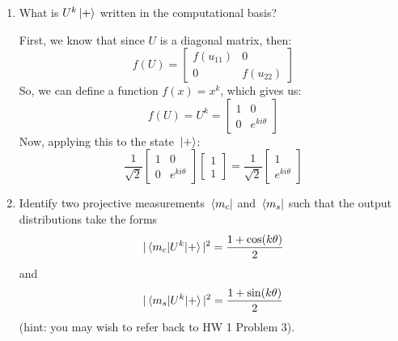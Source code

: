 \documentclass[10pt]{article}
\begin{document}
	 \begin{enumerate}[label=\alph*)]
	 	\item What is \( U^{k}\ket*{+} \) written in the computational basis? 

			\begin{solution}
				First, we know that since \( U \) is a diagonal matrix, then:
				\[
					f(U) = \begin{bmatrix} f(u_{11}) & 0 \\ 0 & f(u_{22}) \end{bmatrix} 
				\] 
				So, we can define a function \( f(x) = x^{k} \), which gives us:
				\[
					f(U) = U^{k} = \begin{bmatrix} 1 & 0 \\ 0 & e^{k i \theta} \end{bmatrix} 
				\] 
				Now, applying this to the state \( \ket*{+} \):
				\[
					\frac{1}{\sqrt{2} }\begin{bmatrix} 1 &0\\0&e^{k i \theta} \end{bmatrix} 
					\begin{bmatrix} 1\\1 \end{bmatrix} = \frac{1}{\sqrt{2} }\begin{bmatrix} 
				1\\e^{k i \theta} \end{bmatrix} 
				\] 
			\end{solution}
		\item Identify two projective measurements \( \bra*{m_c} \) and  \( \bra*{m_s} \) such that 
			the output distributions take the forms
			\[
				|\mel{m_c}{U^{k}}{+}|^2 = \frac{1 + \cos(k \theta)}{2}
			\] 
			and 
			\[
				|\mel{m_s}{U^{k}}{+}|^2 = \frac{1 + \sin(k \theta)}{2}
			\] 
			(hint: you may wish to refer back to HW 1 Problem 3). 


\end{enumerate}
\end{document}
